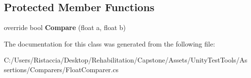 \subsection*{Protected Member Functions}
\begin{DoxyCompactItemize}
\item 
\mbox{\label{class_unity_test_1_1_float_comparer_ae2494b827972b9e80096b8d9691bd788}} 
override bool {\bfseries Compare} (float a, float b)
\end{DoxyCompactItemize}


The documentation for this class was generated from the following file\+:\begin{DoxyCompactItemize}
\item 
C\+:/\+Users/\+Ristaccia/\+Desktop/\+Rehabilitation/\+Capstone/\+Assets/\+Unity\+Test\+Tools/\+Assertions/\+Comparers/Float\+Comparer.\+cs\end{DoxyCompactItemize}
